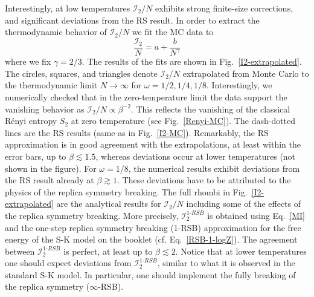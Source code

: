 \documentclass[twocolumn,superscriptaddress,prb,10pt]{revtex4-1}
\begin{document}
Interestingly, at low temperatures ${\mathcal I}_2/N$ exhibits strong finite-size corrections, and 
significant deviations from the RS result. 
In order to extract the thermodynamic behavior of ${\mathcal I}_2/N$ we fit the MC data to 
%
\begin{equation}
\frac{{\mathcal I}_2}{N}=a+\frac{b}{N^\gamma}
\end{equation}
%
where we fix $\gamma=2/3$. The results of the fits are shown in Fig.~\ref{I2-extrapolated}. 
The circles, squares, and triangles denote ${\mathcal I}_2/N$ extrapolated from Monte Carlo to the thermodynamic limit 
$N\to\infty$ for $\omega=1/2,1/4,1/8$. 
Interestingly, we numerically checked that in the zero-temperature limit the data 
support the vanishing behavior as ${\mathcal I}_2/N\propto \beta^{-2}$. This reflects 
the vanishing of the classical R\'enyi entropy $S_2$ at zero temperature (see Fig.~\ref{Renyi-MC}).
The dash-dotted lines are the RS results (same as 
in Fig.~\ref{I2-MC}). Remarkably, the RS approximation is in good agreement with 
the extrapolations, at least within the error bars, up to $\beta\lesssim 1.5$, whereas 
deviations occur at lower temperatures (not shown in the figure). For $\omega=1/8$, 
the numerical results exhibit deviations from the RS result already at $\beta\gtrsim 1$. 
These deviations have to be attributed to the physics of the replica symmetry breaking. 
The full rhombi in Fig.~\ref{I2-extrapolated} are the analytical results for ${\mathcal I}_2/N$ 
including some of the effects of the replica symmetry breaking. More precisely, 
${\mathcal I}_2^{1\textrm{-}RSB}$ is obtained using Eq.~\eqref{MI} and the one-step replica 
symmetry breaking (1-RSB) approximation for the free energy of the S-K model on the 
booklet (cf. Eq.~\eqref{RSB-1-logZ}). The agreement between ${\mathcal I}_2^{1\textrm{-}RSB}$ 
is perfect, at least up to $\beta\lesssim 2$. Notice that at lower temperatures 
one should expect deviations from ${\mathcal I}_2^{1\textrm{-}RSB}$, similar to what it 
is observed in the standard S-K model. In particular, one should implement the fully 
breaking of the replica symmetry ($\infty$-RSB).
 
\end{document}
